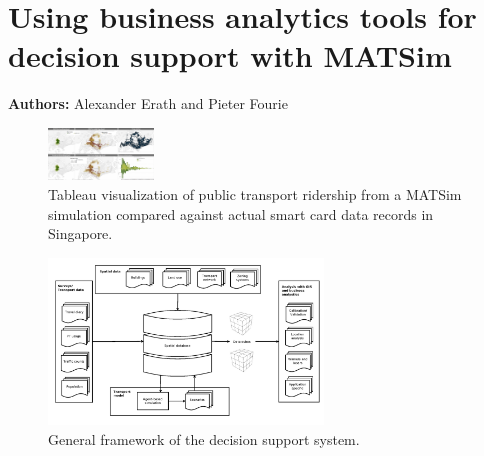 \chapter{Using business analytics tools for decision support with MATSim }
\label{ch:businessanalytics}

\hfill \textbf{Authors:} Alexander Erath and Pieter Fourie
\begin{figure}
\label{fig:analyticsTableau}
\begin{center} \includegraphics[width=0.25\textwidth, angle=0]{extending/figures/businessanalytics/tableau.png} \end{center}
\caption{Tableau visualization of public transport ridership from a MATSim simulation compared against actual smart card data records in Singapore.}
\end{figure}

\begin{figure}
\label{fig:analyticsFramework}
\begin{center} \includegraphics[width=0.65\textwidth, angle=0]{extending/figures/businessanalytics/general} \end{center}
\caption{General framework of the decision support system.}
\end{figure}

